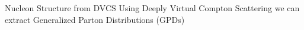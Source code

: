 

\begin{cvskills}

  \cvskill
    {Nucleon Structure from DVCS} %
    {Using Deeply Virtual Compton Scattering we can extract Generalized Parton Distributions (GPDs)} %


\end{cvskills}
